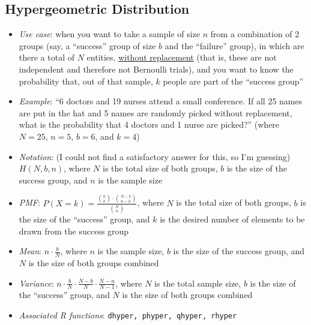 \documentclass[12pt]{article}
\begin{document}
\subsection{Hypergeometric Distribution}
\begin{itemize}
	\item \textit{Use case}: when you want to take a sample of size $n$ from a
	      combination of 2 groups (say, a ``success'' group of size $b$ and the
	      ``failure'' group), in which are there a total of $N$ entities,
	      \underline{without replacement} (that is, these are not independent and
	      therefore not Bernoulli trials), and you want to know the probability
	      that, out of that sample, $k$ people are part of the ``success group''
	\item \textit{Example}: ``6 doctors and 19 nurses attend
	      a small conference. If all 25 names are put in the
	      hat and 5 names are randomly picked without
	      replacement, what is the probability that 4 doctors
	      and 1 nurse are picked?'' (where $N = 25$, $n = 5$, $b = 6$, and $k =
		      4$)
	\item \textit{Notation}: (I could not find a satisfactory answer for this,
	      so I'm guessing) $H(N, b, n)$, where $N$ is the total size of both
	      groups, $b$ is the size of the success group, and $n$ is the sample
	      size
	\item \textit{PMF}: $P(X = k) = \frac{{b\choose k} \cdot {N - b \choose n -
				      k}}{{N \choose n}}$, where $N$ is the total size of both groups, $b$ is
	      the size of the ``success'' group, and $k$ is the desired number of
	      elements to be drawn from the success group
	\item \textit{Mean}: $n \cdot \frac{b}{N}$, where $n$ is
	      the sample size, $b$ is the size of the success
	      group, and $N$ is the size of both groups combined
	\item \textit{Variance}: $n \cdot \frac{b}{N} \cdot
		      \frac{N - b}{N} \cdot \frac{N - n}{N - 1}$, where
	      $N$ is the total sample size, $b$ is the size of the
	      ``success'' group, and $N$ is the size of both
	      groups combined
	\item \textit{Associated R functions}: \verb|dhyper, phyper, qhyper, rhyper|
\end{itemize}
\end{document}
